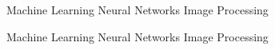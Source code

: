
\begin{coursework}

  \cvcoursev
    {Machine Learning}
    {Neural Networks}
    {Image Processing}
    
  \cvcoursev
    {Machine Learning}
    {Neural Networks}
    {Image Processing}
    

\end{coursework}
